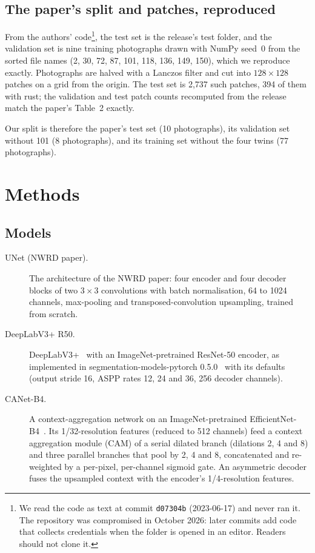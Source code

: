 \documentclass[11pt,a4paper]{article}
\begin{document}
\subsection{The paper's split and patches, reproduced}
From the authors' code\footnote{We read the code as text at commit \texttt{d07304b} (2023-06-17)
and never ran it. The repository was compromised in October 2026: later commits add code that
collects credentials when the folder is opened in an editor. Readers should not clone it.}, the
test set is the release's test folder, and the validation set is nine training photographs drawn
with NumPy seed~0 from the sorted file names (2, 30, 72, 87, 101, 118, 136, 149, 150), which we
reproduce exactly. Photographs are halved with a Lanczos filter and cut into $128\times128$ patches
on a grid from the origin. The test set is 2,737 such patches, 394 of them with rust; the
validation and test patch counts recomputed from the release match the paper's Table~2 exactly.

Our split is therefore the paper's test set (10 photographs), its validation set without 101
(8 photographs), and its training set without the four twins (77 photographs).

\section{Methods}
\label{sec:methods}

\subsection{Models}
\label{sec:models}

\begin{description}
  \item[UNet (NWRD paper).] The architecture of the NWRD paper: four encoder and four decoder
  blocks of two $3\times3$ convolutions with batch normalisation, 64 to 1024 channels, max-pooling
  and transposed-convolution upsampling, trained from scratch.
  \item[DeepLabV3+ R50.] DeepLabV3+~\cite{chen2018deeplabv3plus} with an ImageNet-pretrained
  ResNet-50 encoder, as implemented in segmentation-models-pytorch 0.5.0~\cite{iakubovskii2019smp}
  with its defaults (output stride 16, ASPP rates 12, 24 and 36, 256 decoder channels).
  \item[CANet-B4.] A context-aggregation network on an ImageNet-pretrained
  EfficientNet-B4~\cite{tan2019efficientnet}. Its 1/32-resolution features (reduced to 512
  channels) feed a context aggregation module (CAM) of a serial dilated branch (dilations 2, 4 and
  8) and three parallel branches that pool by 2, 4 and 8, concatenated and re-weighted by a
  per-pixel, per-channel sigmoid gate. An asymmetric decoder fuses the upsampled context with the
  encoder's 1/4-resolution features.
\end{description}
\end{document}
